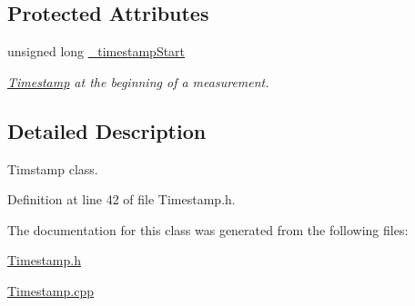 \subsection*{Protected Attributes}
\begin{DoxyCompactItemize}
\item 
unsigned long \hyperlink{class_timestamp_a9adad295553fbb0b4479e04ac4f506a1}{\+\_\+timestamp\+Start}\hypertarget{class_timestamp_a9adad295553fbb0b4479e04ac4f506a1}{}\label{class_timestamp_a9adad295553fbb0b4479e04ac4f506a1}

\begin{DoxyCompactList}\small\item\em \hyperlink{class_timestamp}{Timestamp} at the beginning of a measurement. \end{DoxyCompactList}\end{DoxyCompactItemize}


\subsection{Detailed Description}
Timstamp class. 

Definition at line 42 of file Timestamp.\+h.



The documentation for this class was generated from the following files\+:\begin{DoxyCompactItemize}
\item 
\hyperlink{_timestamp_8h}{Timestamp.\+h}\item 
\hyperlink{_timestamp_8cpp}{Timestamp.\+cpp}\end{DoxyCompactItemize}
